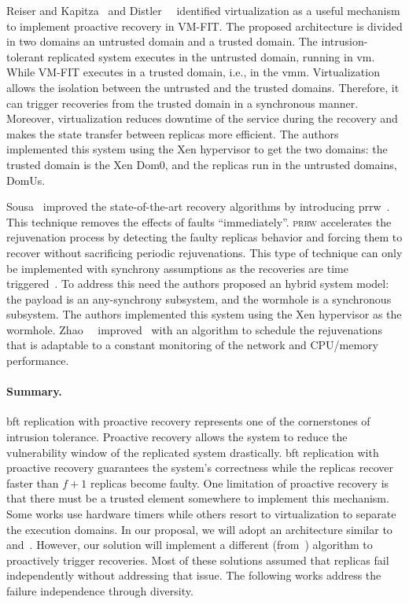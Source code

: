 Reiser and Kapitza~\cite{Reiser:2007} and Distler~\etal{}~\cite{Distler:2008} identified virtualization as a useful mechanism to implement proactive recovery in \textsc{VM-FIT}. 
The proposed architecture is divided in two domains an untrusted domain and a trusted domain.
The intrusion-tolerant replicated system executes in the untrusted domain, running in \gls{vm}. 
While \textsc{VM-FIT} executes in a trusted domain, i.e., in the \gls{vmm}. 
Virtualization allows the isolation between the untrusted and the trusted domains. 
Therefore, it can trigger recoveries from the trusted domain in a synchronous manner. 
Moreover, virtualization reduces downtime of the service during the recovery and makes the state transfer between replicas more efficient. 
The authors implemented this system using the Xen hypervisor to get the two domains: the trusted domain is the Xen Dom0, and the replicas run in the untrusted domains, DomUs.

Sousa~\etal{} improved the state-of-the-art recovery algorithms by introducing \gls{prrw}~\cite{Sousa:2010}. 
This technique removes the effects of faults ``immediately''. 
\textsc{\gls{prrw}} accelerates the rejuvenation process by detecting the faulty replicas behavior and forcing them to recover without sacrificing periodic rejuvenations. 
This type of technique can only be implemented with synchrony assumptions as the recoveries are time triggered~\cite{Sousa:2005}. 
To address this need the authors proposed an hybrid system model: the payload is an any-synchrony subsystem, and the wormhole is a synchronous subsystem. 
The authors implemented this system using the Xen hypervisor as the wormhole. 
Zhao~\etal{}~\cite{Zhao:2012} improved~\cite{Sousa:2010} with an algorithm to schedule the rejuvenations that is adaptable to a constant monitoring of the network and CPU/memory performance.


\paragraph{Summary.} \gls{bft} replication with proactive recovery represents one of the cornerstones of intrusion tolerance. 
Proactive recovery allows the system to reduce the vulnerability window of the replicated system drastically. 
\gls{bft} replication with proactive recovery guarantees the system's correctness while the replicas recover faster than $f+1$ replicas become faulty. 
One limitation of proactive recovery is that there must be a trusted element somewhere to implement this mechanism. 
Some works use hardware timers while others resort to virtualization to separate the execution domains. 
In our proposal, we will adopt an architecture similar to~\cite{Distler:2008} and~\cite{Sousa:2010}. 
However, our solution will implement a different (from~\cite{Sousa:2010}) algorithm to proactively trigger recoveries.
Most of these solutions assumed that replicas fail independently without addressing that issue. 
The following works address the failure independence through diversity. 


